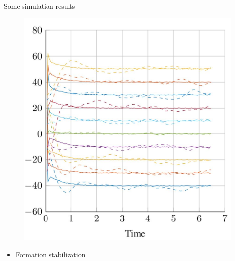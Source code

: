 \begin{frame}{Some simulation results}
\begin{minipage}{0.45\textwidth}
\begin{figure}
			\includegraphics[width=1\textwidth]{doc/2_Formation_control/formation_stabilization.jpg}
		\end{figure}
		\begin{itemize}
			\item Formation stabilization
		\end{itemize}		
	\end{minipage}	
\end{frame}	
